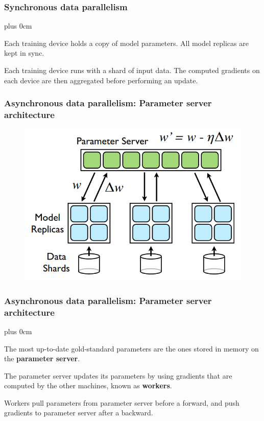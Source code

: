 \documentclass[11pt]{beamer}
\renewcommand{\raggedright}{\leftskip=0pt \rightskip=0pt plus 0cm}
\let\olditemize=\itemize
\renewenvironment{itemize}{\olditemize\raggedright}{\endlist}
\begin{document}
\begin{frame}
\frametitle{Synchronous data parallelism}
\begin{itemize}
\item Each training device holds a copy of model parameters. All model replicas are kept in sync.
\item Each training device runs with a shard of input data. The computed gradients on each device are then aggregated before performing an update.
\end{itemize}
\end{frame}
\begin{frame}
\frametitle{Asynchronous data parallelism: Parameter server architecture}
\begin{figure}
	\includegraphics[scale=.3]{images/model/arch-param-server.png}
\end{figure}
\end{frame}
\begin{frame}
	\frametitle{Asynchronous data parallelism: Parameter server architecture}
	\begin{itemize}
		\item The most up-to-date gold-standard parameters are the ones stored in memory on the \textbf{parameter server}.
		\item The parameter server updates its parameters by using gradients that are computed by the other machines, known as \textbf{workers}.
		\item Workers pull parameters from parameter server before a forward, and push gradients to parameter server after a backward.
	\end{itemize}
\end{frame}
\end{document}
